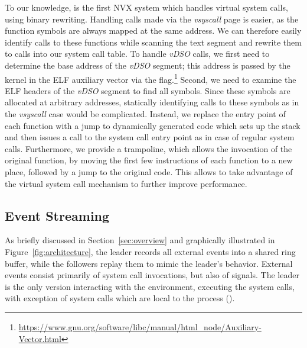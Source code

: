 To our knowledge, \nx is the first NVX system which handles virtual
system calls, using binary rewriting. 
Handling calls made via the \textit{vsyscall} page is easier, as
the function symbols are always mapped at the same address.  
We can therefore easily identify calls to these functions while
scanning the text segment and rewrite them to calls into our system
call table.
To handle \textit{vDSO} calls, we first need to
determine the base address of the \textit{vDSO} segment; this address
is passed by the kernel in the ELF auxiliary vector via the
flag.\footnote{\url{https://www.gnu.org/software/libc/manual/html_node/Auxiliary-Vector.html}}
Second, we need to examine the ELF headers of the \textit{vDSO}
segment to find all symbols.  Since these symbols are allocated at
arbitrary addresses, statically identifying calls to these symbols as
in the \textit{vsyscall} case would be complicated. Instead, we
replace the entry point of each function with a jump to dynamically
generated code which sets up the stack and then issues a call to the
\nx system call entry point as in case of regular system
calls. Furthermore, we provide a trampoline, which allows the
invocation of the original function, by moving the first few
instructions of each function to a new place, followed by a jump to
the original code. This allows \nx to take advantage of the virtual
system call mechanism to further improve performance.




\subsection{Event Streaming}
\label{sec:streaming}

As briefly discussed in Section~\ref{sec:overview} and graphically
illustrated in Figure~\ref{fig:architecture}, the leader records all
external events into a shared ring buffer, while the followers replay
them to mimic the leader's behavior.  External events consist
primarily of system call invocations, but also of signals.  The leader
is the only version interacting with the environment, \ie executing
the system calls, with exception of system calls which are local to
the process (\eg {}). %

